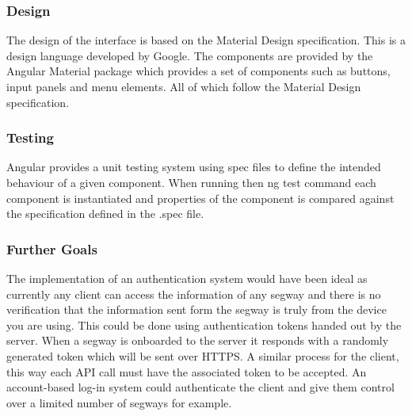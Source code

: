 \subsubsection{Design}
The design of the interface is based on the Material Design specification. This is a design language developed by Google. The components are provided by the Angular Material package which 
provides a set of components such as buttons, input panels and menu elements. All of which follow the Material Design specification.~\cite{ref:angular_material}


\subsubsection{Testing}
Angular provides a unit testing system using spec files to define the intended behaviour of a given component. When running then ng test command each component is instantiated and properties of the component is compared against the specification defined in the .spec file.

\subsubsection{Further Goals}
The implementation of an authentication system would have been ideal 
as currently any client can access the information of any segway and
there is no verification that the information sent form the segway is
truly from the device you are using. This could be done using authentication tokens
handed out by the server. When a segway is onboarded to the server
it responds with a randomly generated token which will be sent 
over HTTPS. A similar process for the client, this way each API
call must have the associated token to be accepted. 
An account-based log-in system could authenticate the client 
and give them control over a limited number of segways for example.